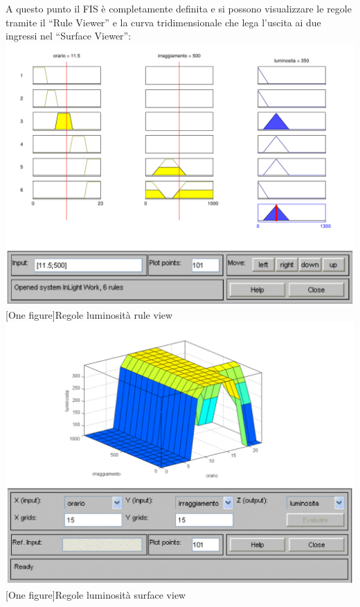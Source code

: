A questo punto il FIS è completamente definita e si possono visualizzare le regole tramite il “Rule Viewer” e la curva tridimensionale che lega l'uscita ai due ingressi nel “Surface Viewer”:\\

\vspace{20px}
\includegraphics[scale=0.5]{images/fuzzy/regole_luminosita_rule_view.pdf}
[One figure]{Regole luminosità rule view}
\vspace{20px}
\vspace{20px}
\includegraphics[scale=0.5]{images/fuzzy/regole_luminosita_surface_view.pdf}
[One figure]{Regole luminosità surface view}
\vspace{20px}

